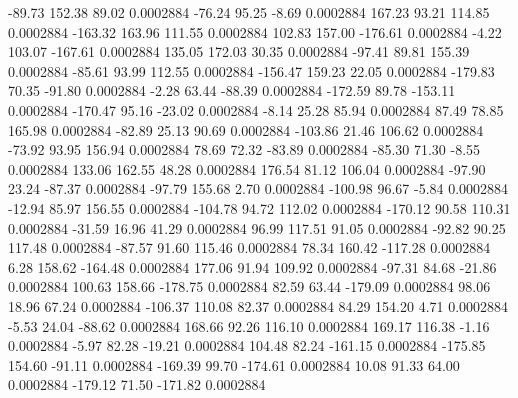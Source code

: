       -89.73      152.38       89.02     0.0002884
      -76.24       95.25       -8.69     0.0002884
      167.23       93.21      114.85     0.0002884
     -163.32      163.96      111.55     0.0002884
      102.83      157.00     -176.61     0.0002884
       -4.22      103.07     -167.61     0.0002884
      135.05      172.03       30.35     0.0002884
      -97.41       89.81      155.39     0.0002884
      -85.61       93.99      112.55     0.0002884
     -156.47      159.23       22.05     0.0002884
     -179.83       70.35      -91.80     0.0002884
       -2.28       63.44      -88.39     0.0002884
     -172.59       89.78     -153.11     0.0002884
     -170.47       95.16      -23.02     0.0002884
       -8.14       25.28       85.94     0.0002884
       87.49       78.85      165.98     0.0002884
      -82.89       25.13       90.69     0.0002884
     -103.86       21.46      106.62     0.0002884
      -73.92       93.95      156.94     0.0002884
       78.69       72.32      -83.89     0.0002884
      -85.30       71.30       -8.55     0.0002884
      133.06      162.55       48.28     0.0002884
      176.54       81.12      106.04     0.0002884
      -97.90       23.24      -87.37     0.0002884
      -97.79      155.68        2.70     0.0002884
     -100.98       96.67       -5.84     0.0002884
      -12.94       85.97      156.55     0.0002884
     -104.78       94.72      112.02     0.0002884
     -170.12       90.58      110.31     0.0002884
      -31.59       16.96       41.29     0.0002884
       96.99      117.51       91.05     0.0002884
      -92.82       90.25      117.48     0.0002884
      -87.57       91.60      115.46     0.0002884
       78.34      160.42     -117.28     0.0002884
        6.28      158.62     -164.48     0.0002884
      177.06       91.94      109.92     0.0002884
      -97.31       84.68      -21.86     0.0002884
      100.63      158.66     -178.75     0.0002884
       82.59       63.44     -179.09     0.0002884
       98.06       18.96       67.24     0.0002884
     -106.37      110.08       82.37     0.0002884
       84.29      154.20        4.71     0.0002884
       -5.53       24.04      -88.62     0.0002884
      168.66       92.26      116.10     0.0002884
      169.17      116.38       -1.16     0.0002884
       -5.97       82.28      -19.21     0.0002884
      104.48       82.24     -161.15     0.0002884
     -175.85      154.60      -91.11     0.0002884
     -169.39       99.70     -174.61     0.0002884
       10.08       91.33       64.00     0.0002884
     -179.12       71.50     -171.82     0.0002884
